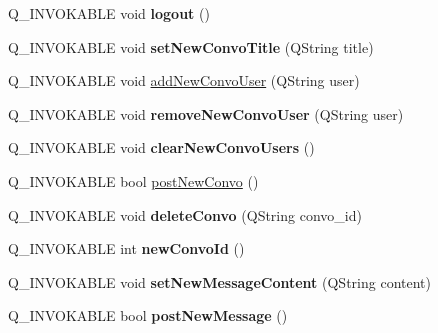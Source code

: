 \begin{DoxyCompactItemize}
\item 
\hypertarget{classHttpManager_a69067bb2736567a01f69595fac80398b}{Q\-\_\-\-I\-N\-V\-O\-K\-A\-B\-L\-E void {\bfseries logout} ()}\label{classHttpManager_a69067bb2736567a01f69595fac80398b}

\item 
\hypertarget{classHttpManager_abc77a75cfec070dc986707bdab152c49}{Q\-\_\-\-I\-N\-V\-O\-K\-A\-B\-L\-E void {\bfseries set\-New\-Convo\-Title} (Q\-String title)}\label{classHttpManager_abc77a75cfec070dc986707bdab152c49}

\item 
Q\-\_\-\-I\-N\-V\-O\-K\-A\-B\-L\-E void \hyperlink{classHttpManager_ac345aafb8d298dd34573971f3a7ad242}{add\-New\-Convo\-User} (Q\-String user)
\item 
\hypertarget{classHttpManager_afc880ea260ad8d393259f44762799278}{Q\-\_\-\-I\-N\-V\-O\-K\-A\-B\-L\-E void {\bfseries remove\-New\-Convo\-User} (Q\-String user)}\label{classHttpManager_afc880ea260ad8d393259f44762799278}

\item 
\hypertarget{classHttpManager_aa8bf26e7de4b36c0e96ee06baccfd933}{Q\-\_\-\-I\-N\-V\-O\-K\-A\-B\-L\-E void {\bfseries clear\-New\-Convo\-Users} ()}\label{classHttpManager_aa8bf26e7de4b36c0e96ee06baccfd933}

\item 
Q\-\_\-\-I\-N\-V\-O\-K\-A\-B\-L\-E bool \hyperlink{classHttpManager_a1abaa98249ae82e1742b3ffbcf33fa4f}{post\-New\-Convo} ()
\item 
\hypertarget{classHttpManager_a97d6513de9a9c490dcd982921d320104}{Q\-\_\-\-I\-N\-V\-O\-K\-A\-B\-L\-E void {\bfseries delete\-Convo} (Q\-String convo\-\_\-id)}\label{classHttpManager_a97d6513de9a9c490dcd982921d320104}

\item 
\hypertarget{classHttpManager_a974c08cbe0f522aab3bf0ff51ca37296}{Q\-\_\-\-I\-N\-V\-O\-K\-A\-B\-L\-E int {\bfseries new\-Convo\-Id} ()}\label{classHttpManager_a974c08cbe0f522aab3bf0ff51ca37296}

\item 
\hypertarget{classHttpManager_a78b37f4dc5025c91072a4ab073adc7f0}{Q\-\_\-\-I\-N\-V\-O\-K\-A\-B\-L\-E void {\bfseries set\-New\-Message\-Content} (Q\-String content)}\label{classHttpManager_a78b37f4dc5025c91072a4ab073adc7f0}

\item 
\hypertarget{classHttpManager_a695213e7f8b379811f09846e979fd50e}{Q\-\_\-\-I\-N\-V\-O\-K\-A\-B\-L\-E bool {\bfseries post\-New\-Message} ()}\label{classHttpManager_a695213e7f8b379811f09846e979fd50e}


\end{DoxyCompactItemize}
